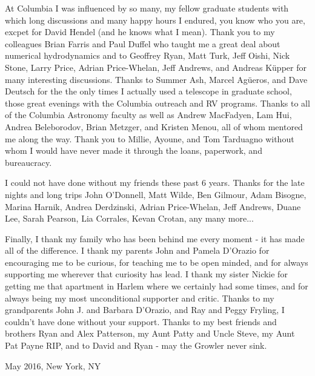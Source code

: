 At Columbia I was influenced by so many, my fellow graduate students with
which long discussions and many happy hours I endured, you know who you are, excpet for David Hendel (and he knows what I mean). %
Thank you to my colleagues Brian Farris and Paul Duffel who taught me a great
deal about numerical hydrodynamics and to Geoffrey Ryan, Matt Turk, Jeff
Oishi, Nick Stone, Larry Price, Adrian Price-Whelan, Jeff Andrews, and Andreas
K\"upper for many interesting discussions. Thanks to Summer Ash, Marcel Ag\"ueros,
and Dave Deutsch for the the only times I actually used a telescope in
graduate school, those great evenings with the Columbia outreach and RV
programs. Thanks to all of the Columbia Astronomy faculty as well as Andrew
MacFadyen, Lam Hui, Andrea Beleborodov, Brian Metzger, and Kristen Menou, all
of whom mentored me along the way. Thank you to Millie, Ayoune, and Tom
Tarduagno without whom I would have never made it through the loans,
paperwork, and bureaucracy.

I could not have done without my friends these past 6 years. Thanks for the
late nights and long trips John O'Donnell, Matt Wilde, Ben Gilmour, Adam
Bisogne, Marina Harnik, Andrea Derdzinski, Adrian Price-Whelan, Jeff Andrews, Duane Lee, Sarah Pearson, Lia Corrales, Kevan Crotan, any many more...

Finally, I thank my family who has been behind me every moment - it has made
all of the difference. I thank my parents John and Pamela D'Orazio for
encouraging me to be curious, for teaching me to be open minded, and for
always supporting me wherever that curiosity has lead. I thank my sister
Nickie for getting me that apartment in Harlem where we certainly had some
times, and for always being my most unconditional supporter and critic. Thanks
to my grandparents John J. and Barbara D'Orazio, and Ray and Peggy Fryling, I
couldn't have done without your support. Thanks to my best friends and
brothers Ryan and Alex Patterson, my Aunt Patty and Uncle Steve, my
Aunt Pat Payne RIP, and to David and Ryan - may the Growler never sink.




















\vspace{0.5cm}
May 2016, New York, NY

